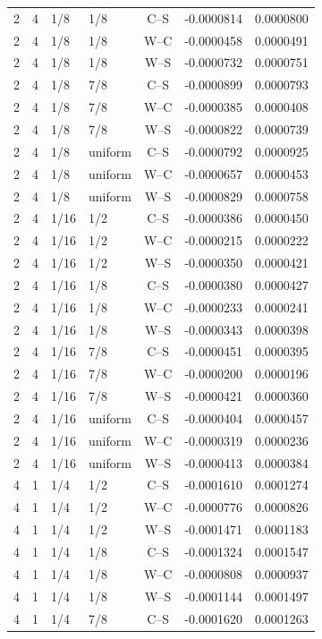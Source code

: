 \begin{longtable}{rrllcrr}
2 & 4 & 1/8 & 1/8 & C--S & -0.0000814 & 0.0000800 \\
2 & 4 & 1/8 & 1/8 & W--C & -0.0000458 & 0.0000491 \\
2 & 4 & 1/8 & 1/8 & W--S & -0.0000732 & 0.0000751 \\
2 & 4 & 1/8 & 7/8 & C--S & -0.0000899 & 0.0000793 \\
2 & 4 & 1/8 & 7/8 & W--C & -0.0000385 & 0.0000408 \\
2 & 4 & 1/8 & 7/8 & W--S & -0.0000822 & 0.0000739 \\
2 & 4 & 1/8 & uniform & C--S & -0.0000792 & 0.0000925 \\
2 & 4 & 1/8 & uniform & W--C & -0.0000657 & 0.0000453 \\
2 & 4 & 1/8 & uniform & W--S & -0.0000829 & 0.0000758 \\
2 & 4 & 1/16 & 1/2 & C--S & -0.0000386 & 0.0000450 \\
2 & 4 & 1/16 & 1/2 & W--C & -0.0000215 & 0.0000222 \\
2 & 4 & 1/16 & 1/2 & W--S & -0.0000350 & 0.0000421 \\
2 & 4 & 1/16 & 1/8 & C--S & -0.0000380 & 0.0000427 \\
2 & 4 & 1/16 & 1/8 & W--C & -0.0000233 & 0.0000241 \\
2 & 4 & 1/16 & 1/8 & W--S & -0.0000343 & 0.0000398 \\
2 & 4 & 1/16 & 7/8 & C--S & -0.0000451 & 0.0000395 \\
2 & 4 & 1/16 & 7/8 & W--C & -0.0000200 & 0.0000196 \\
2 & 4 & 1/16 & 7/8 & W--S & -0.0000421 & 0.0000360 \\
2 & 4 & 1/16 & uniform & C--S & -0.0000404 & 0.0000457 \\
2 & 4 & 1/16 & uniform & W--C & -0.0000319 & 0.0000236 \\
2 & 4 & 1/16 & uniform & W--S & -0.0000413 & 0.0000384 \\
4 & 1 & 1/4 & 1/2 & C--S & -0.0001610 & 0.0001274 \\
4 & 1 & 1/4 & 1/2 & W--C & -0.0000776 & 0.0000826 \\
4 & 1 & 1/4 & 1/2 & W--S & -0.0001471 & 0.0001183 \\
4 & 1 & 1/4 & 1/8 & C--S & -0.0001324 & 0.0001547 \\
4 & 1 & 1/4 & 1/8 & W--C & -0.0000808 & 0.0000937 \\
4 & 1 & 1/4 & 1/8 & W--S & -0.0001144 & 0.0001497 \\
4 & 1 & 1/4 & 7/8 & C--S & -0.0001620 & 0.0001263 \\

\end{longtable}
